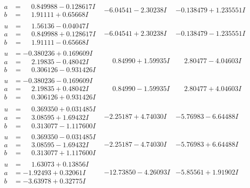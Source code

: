 \documentclass[1p]{elsarticle_modified}
\theoremstyle{definition}
\begin{document}
$$\begin{array}{c|c|c}
\begin{aligned}
a &= \phantom{-}0.849988 - 0.128617 I \\
b &= \phantom{-}1.91111 + 0.65668 I\end{aligned}
 & -6.04541 - 2.30238 I & -0.138479 + 1.235551 I \\ \hline\begin{aligned}
u &= \phantom{-}1.56136 - 0.04047 I \\
a &= \phantom{-}0.849988 + 0.128617 I \\
b &= \phantom{-}1.91111 - 0.65668 I\end{aligned}
 & -6.04541 + 2.30238 I & -0.138479 - 1.235551 I \\ \hline\begin{aligned}
u &= -0.380236 + 0.169609 I \\
a &= \phantom{-}2.19835 - 0.48042 I \\
b &= \phantom{-}0.306126 - 0.931426 I\end{aligned}
 & \phantom{-}0.84990 + 1.59935 I & \phantom{-}2.80477 - 4.04603 I \\ \hline\begin{aligned}
u &= -0.380236 - 0.169609 I \\
a &= \phantom{-}2.19835 + 0.48042 I \\
b &= \phantom{-}0.306126 + 0.931426 I\end{aligned}
 & \phantom{-}0.84990 - 1.59935 I & \phantom{-}2.80477 + 4.04603 I \\ \hline\begin{aligned}
u &= \phantom{-}0.369350 + 0.031485 I \\
a &= \phantom{-}3.08595 + 1.69432 I \\
b &= \phantom{-}0.313077 - 1.117600 I\end{aligned}
 & -2.25187 + 4.74030 I & -5.76983 - 6.64488 I \\ \hline\begin{aligned}
u &= \phantom{-}0.369350 - 0.031485 I \\
a &= \phantom{-}3.08595 - 1.69432 I \\
b &= \phantom{-}0.313077 + 1.117600 I\end{aligned}
 & -2.25187 - 4.74030 I & -5.76983 + 6.64488 I \\ \hline\begin{aligned}
u &= \phantom{-}1.63073 + 0.13856 I \\
a &= -1.92493 + 0.32061 I \\
b &= -3.63978 + 0.32775 I\end{aligned}
 & -12.73850 - 4.26093 I & -5.85561 + 1.91902 I \\ \hline\begin{aligned}

\end{aligned}
\end{array}$$
\end{document}
